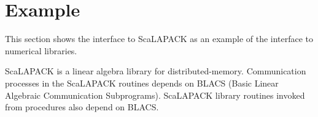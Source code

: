 %
%
%
%
%
%
%
%
%


\section{Example}

   This section shows the interface to ScaLAPACK as an example of the
   {\XMP} interface to numerical libraries.
   
   ScaLAPACK is a linear algebra library for distributed-memory.
   Communication processes in the ScaLAPACK routines depends on BLACS
   (Basic Linear Algebraic Communication Subprograms).
   ScaLAPACK library routines invoked from {\XMP} procedures also depend
   on BLACS. %

